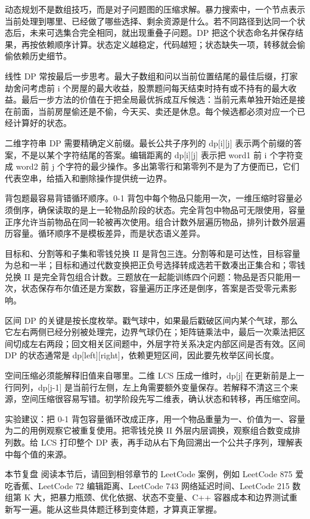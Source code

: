 
动态规划不是数组技巧，而是对子问题图的压缩求解。暴力搜索中，一个节点表示当前处理到哪里、已经做了哪些选择、剩余资源是什么。若不同路径到达同一个状态后，未来可选集合完全相同，就出现重叠子问题。DP 把这个状态命名并保存结果，再按依赖顺序计算。状态定义越稳定，代码越短；状态缺失一项，转移就会偷偷依赖历史细节。

线性 DP 常按最后一步思考。最大子数组和问以当前位置结尾的最佳后缀，打家劫舍问考虑前 i 个房屋的最大收益，股票题问每天结束时持有或不持有的最大收益。最后一步方法的价值在于把全局最优拆成互斥候选：当前元素单独开始还是接在前面，当前房屋偷还是不偷，今天买、卖还是休息。每个候选都必须对应一个已经计算好的状态。

二维字符串 DP 需要精确定义前缀。最长公共子序列的 dp[i][j] 表示两个前缀的答案，不是以某个字符结尾的答案。编辑距离的 dp[i][j] 表示把 word1 前 i 个字符变成 word2 前 j 个字符的最少操作。多出第零行和第零列不是为了方便而已，它们代表空串，给插入和删除操作提供统一边界。

背包题最容易背错循环顺序。0-1 背包中每个物品只能用一次，一维压缩时容量必须倒序，确保读取的是上一轮物品阶段的状态。完全背包中物品可无限使用，容量正序允许当前物品在同一轮被再次使用。组合计数外层遍历物品，排列计数外层遍历容量。循环顺序不是模板差异，而是状态语义差异。

目标和、分割等和子集和零钱兑换 II 是背包三连。分割等和是可达性，目标容量为总和一半；目标和通过代数变换把正负号选择转成选若干数凑出正集合和；零钱兑换 II 是完全背包组合计数。三题放在一起能训练四个问题：物品是否只能用一次，状态保存布尔值还是方案数，容量遍历正序还是倒序，答案是否受零元素影响。

区间 DP 的关键是按长度枚举。戳气球中，如果最后戳破区间内某个气球，那么它左右两侧已经分别被处理完，边界气球仍在；矩阵链乘法中，最后一次乘法把区间切成左右两段；回文相关区间题中，外层字符关系决定内部区间是否有效。区间 DP 的状态通常是 dp[left][right]，依赖更短区间，因此要先枚举区间长度。

空间压缩必须能解释旧值来自哪里。二维 LCS 压成一维时，dp[j] 在更新前是上一行同列，dp[j-1] 是当前行左侧，左上角需要额外变量保存。若解释不清这三个来源，空间压缩很容易写错。初学阶段先写二维表，确认状态和转移，再压缩空间。

实验建议：把 0-1 背包容量循环改成正序，用一个物品重量为一、价值为一、容量为二的用例观察它被重复使用。把零钱兑换 II 外层内层调换，观察组合数变成排列数。给 LCS 打印整个 DP 表，再手动从右下角回溯出一个公共子序列，理解表中每个值的来源。

\begin{principlebox}{本节复盘}
阅读本节后，请回到相邻章节的 LeetCode 案例，例如 LeetCode 875 爱吃香蕉、LeetCode 72 编辑距离、LeetCode 743 网络延迟时间、LeetCode 215 数组第 K 大，把暴力瓶颈、优化依据、状态不变量、C++ 容器成本和边界测试重新写一遍。能从这些具体题迁移到变体题，才算真正掌握。
\end{principlebox}
